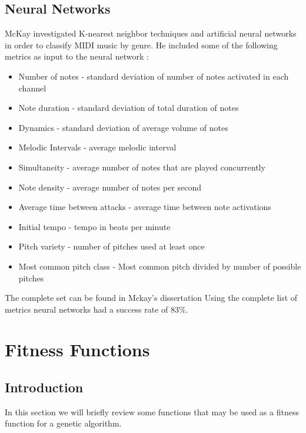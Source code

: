 \section{Neural Networks}
McKay investigated K-nearest neighbor techniques and artificial neural networks in order to classify \ac{MIDI} music by genre.
He included some of the following metrics as input to the neural network \cite{Mckay2004}:
\begin{itemize}
\item Number of notes - standard deviation of number of notes activated in each channel
\item Note duration - standard deviation of total duration of notes
\item Dynamics - standard deviation of average volume of notes
\item Melodic Intervals - average melodic interval
\item Simultaneity - average number of notes that are played concurrently
\item Note density - average number of notes per second
\item Average time between attacks - average time between note activations
\item Initial tempo - tempo in beats per minute
\item Pitch variety - number of pitches used at least once
\item Most common pitch class - Most common pitch divided by number of possible pitches
\end{itemize}
The complete set can be found in Mckay's dissertation \cite{Mckay2004}
Using the complete list of metrics neural networks had a success rate of $83\%$.

\chapter{Fitness Functions}\label{sec:chapfitness}


\section{Introduction}
In this section we will briefly review some functions that may be used as a fitness function for a genetic algorithm.

